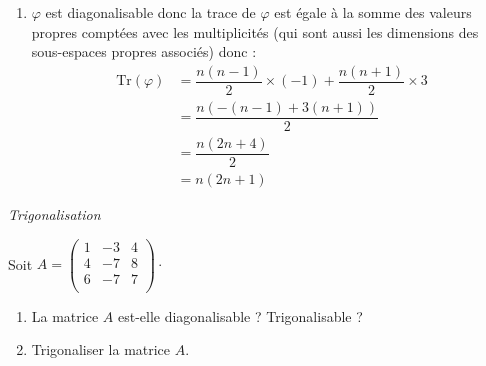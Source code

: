 \documentclass[a4paper,10pt]{report}
\begin{document}
\begin{enumerate}
\item $\varphi$ est diagonalisable donc la trace de $\varphi$ est égale à la somme des valeurs propres comptées avec les multiplicités (qui sont aussi les dimensions des sous-espaces propres associés) donc :
\begin{align*}
\textrm{Tr}(\varphi)& = \dfrac{n(n-1)}{2} \times (-1) + \dfrac{n(n+1)}{2} \times 3  \\
& = \dfrac{n(-(n-1)+3(n+1))}{2} \\
& = \dfrac{n(2n+4)}{2} \\
& = n(2n+1) 
\end{align*}
\end{enumerate}



\medskip

\begin{center}
\textit{{ {\large Trigonalisation}}}
\end{center}

\medskip

\begin{Exercice}{} Soit $A= \begin{pmatrix}
1 & -3 & 4 \\
4 & -7 & 8 \\
6 & -7 & 7 \\
\end{pmatrix}\cdot$

\begin{enumerate}
\item La matrice $A$ est-elle diagonalisable ? Trigonalisable ?
\item Trigonaliser la matrice $A$. 
\end{enumerate}
\end{Exercice}

\corr 
\end{document}
